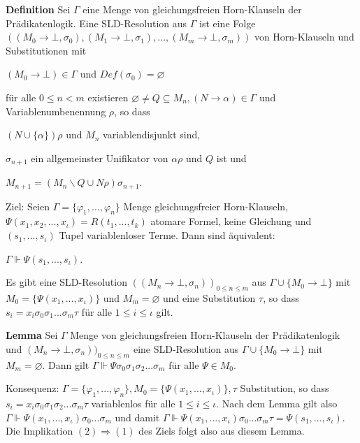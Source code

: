\documentclass[a4paper]{article}
\renewcommand{\note}[2]{\begin{noteBox} \textbf{#1} #2 \end{noteBox}}
\begin{document}
\begin{multicols}{3}
  \note{Definition}{Sei $\Gamma$ eine Menge von gleichungsfreien Horn-Klauseln der Prädikatenlogik. Eine SLD-Resolution aus $\Gamma$ ist eine Folge $((M_0\rightarrow\bot,\sigma_0),(M_1\rightarrow\bot,\sigma_1),...,(M_m\rightarrow\bot,\sigma_m))$ von Horn-Klauseln und Substitutionen mit
    \begin{itemize*}
      \item $(M_0\rightarrow\bot)\in\Gamma$ und $Def(\sigma_0)=\varnothing$
      \item für alle $0\leq n<m$ existieren $\varnothing\not=Q\subseteq M_n,(N\rightarrow\alpha)\in\Gamma$ und Variablenumbenennung $\rho$, so dass
      \begin{itemize*}
        \item $(N\cup\{\alpha\})\rho$ und $M_n$ variablendisjunkt sind,
        \item $\sigma_{n+1}$ ein allgemeinster Unifikator von $\alpha\rho$ und $Q$ ist und
        \item $M_{n+1} = (M_n\backslash Q\cup N\rho)\sigma_{n+1}$.
      \end{itemize*}
    \end{itemize*}
  }

  Ziel:
  Seien $\Gamma=\{\varphi_1,...,\varphi_n\}$ Menge gleichungsfreier Horn-Klauseln, $\Psi(x_1,x_2 ,...,x_{\iota}) =R(t_1 ,...,t_k)$ atomare Formel, keine Gleichung und $(s_1,...,s_{\iota})$ Tupel variablenloser Terme.
  Dann sind äquivalent:
  \begin{enumerate*}
    \item $\Gamma\Vdash\Psi(s_1,...,s_{\iota})$.
    \item Es gibt eine SLD-Resolution $((M_n\rightarrow\bot,\sigma_n))_{0\leq n\leq m}$ aus $\Gamma\cup\{M_0\rightarrow\bot\}$ mit $M_0=\{\Psi(x_1,...,x_{\iota})\}$ und $M_m=\varnothing$ und eine Substitution $\tau$, so dass $s_i=x_i\sigma_0 \sigma_1 ...\sigma_m\tau$ für alle $1\leq i\leq \iota$ gilt.
  \end{enumerate*}

  \note{Lemma}{Sei $\Gamma$ Menge von gleichungsfreien Horn-Klauseln der Prädikatenlogik und $(M_n \rightarrow\bot,\sigma_n))_{0\leq n\leq m}$ eine SLD-Resolution aus $\Gamma\cup\{M_0\rightarrow\bot\}$ mit $M_m=\varnothing$.
    Dann gilt $\Gamma\Vdash\Psi\sigma_0 \sigma_1\sigma_2...\sigma_m$ für alle $\Psi\in M_0$.}

  Konsequenz:
  $\Gamma=\{\varphi_1,...,\varphi_n\},M_0 =\{\Psi(x_1,...,x_{\iota})\},\tau$ Substitution, so dass $s_i=x_i \sigma_0 \sigma_1 \sigma_2 ...\sigma_m \tau$ variablenlos für alle $1\leq i \leq \iota$. Nach dem Lemma gilt also $\Gamma \Vdash\Psi(x_1,...,x_{\iota})\sigma_0 ...\sigma_m$ und damit $\Gamma\Vdash\Psi(x_1 ,...,x_{\iota} )\sigma_0 ...\sigma_m\tau=\Psi(s_1,...,s_{\iota} )$.
  Die Implikation $(2)\Rightarrow (1)$ des Ziels folgt also aus diesem Lemma.


\end{multicols}
\end{document}
